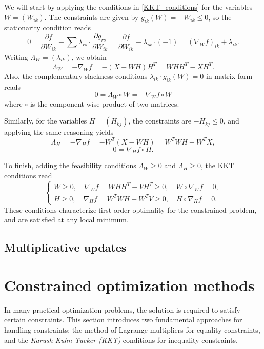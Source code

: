 \documentclass{amsart}
\begin{document}
We will start by applying the conditions in \eqref{KKT_conditions} for the variables $W=(W_{ik})$. The constraints are given by $g_{ik}(W)= -W_{ik}\leq 0$, so the stationarity condition reads
\[
    0= \frac{\partial f}{\partial W_{ik}} -\sum_{} \lambda_{rs}\cdot \frac{\partial g_{rs}}{\partial W_{ik}} = \frac{\partial f}{\partial W_{ik}} -\lambda_{ik}\cdot (-1)= \left(\nabla_W f\right)_{ik} +\lambda_{ik}.
\]
Writing $\Lambda_W=(\lambda_{ik})$, we obtain
\[
    \Lambda_W= -\nabla_W f= -(X-WH)H^T= WHH^T -XH^T.
\]
Also, the complementary slackness conditions $\lambda_{ik}\cdot g_{ik}(W)=0$ in matrix form reads
\[
    0= \Lambda_W\circ W= -\nabla_W f\circ W
\]
where $\circ$ is the component-wise product of two matrices.

Similarly, for the variables $H=(H_{kj})$, the constraints are $-H_{kj}\leq 0$, and applying the same reasoning yields
\[
    \Lambda_H= -\nabla_H f= -W^T(X-WH)= W^TWH -W^TX,
\]
\[
    0= \nabla_H f\circ H.
\]

To finish, adding the feasibility conditions $\Lambda_W\geq 0$ and $\Lambda_H\geq 0$, the KKT conditions read
\begin{equation}
    \begin{cases}
        W \geq 0,\quad \nabla_W f = WHH^T - VH^T \geq 0,\quad W \circ \nabla_W f = 0, \\
        H \geq 0,\quad \nabla_H f = W^TWH - W^TV \geq 0,\quad H \circ \nabla_H f = 0.
    \end{cases}
\end{equation}
These conditions characterize first-order optimality for the constrained problem, and are satisfied at any local minimum.

\subsection{Multiplicative updates}




\appendix

\section{Constrained optimization methods}\label{constrained_optimization_methods}

In many practical optimization problems, the solution is required to satisfy certain constraints. This section introduces two fundamental approaches for handling constraints: the method of Lagrange multipliers for equality constraints, and the {\it Karush-Kuhn-Tucker (KKT)} conditions for inequality constraints.
\end{document}
